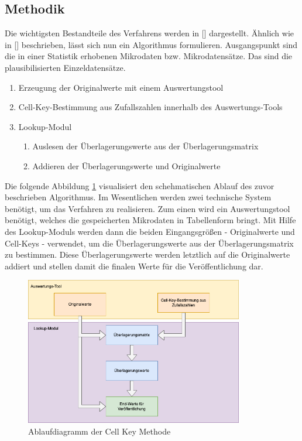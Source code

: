 \subsection{Methodik}%

Die wichtigsten Bestandteile des Verfahrens werden in [\cite{Enderle}] dargestellt. Ähnlich wie in [\cite{Wipke}] beschrieben, lässt sich nun ein Algorithmus formulieren. Ausgangspunkt sind die in einer Statistik erhobenen Mikrodaten bzw. Mikrodatensätze. Das sind die plausibilisierten Einzeldatensätze.

\begin{enumerate}
    \item Erzeugung der Originalwerte mit einem Auswertungstool
    \item Cell-Key-Bestimmung aus Zufallszahlen innerhalb des Auswertungs-Tools
    \item Lookup-Modul
    \begin{enumerate}
        \item Auslesen der Überlagerungswerte aus der Überlagerungsmatrix
        \item Addieren der Überlagerungswerte und Originalwerte
    \end{enumerate}
\end{enumerate}

Die folgende Abbildung \ref{fig_ckm_chart} visualisiert den schehmatischen Ablauf des zuvor beschrieben Algorithmus. Im Wesentlichen werden zwei technische System benötigt, um das Verfahren zu realisieren. Zum einen wird ein Auswertungstool benötigt, welches die gespeicherten Mikrodaten in Tabellenform bringt. Mit Hilfe des Lookup-Moduls werden dann die beiden Eingangsgrö\ss en - Originalwerte und Cell-Keys - verwendet, um die Überlagerungswerte aus der Überlagerungsmatrix zu bestimmen. Diese Überlagerungswerte werden letztlich auf die Originalwerte addiert und stellen damit die finalen Werte für die Veröffentlichung dar. 

\begin{figure}[H]
    \begin{center}
        \includegraphics[width=0.85\textwidth]{img/ckm_flow.png}
        \caption{Ablaufdiagramm der Cell Key Methode}
        \label{fig_ckm_chart}
    \end{center}
\end{figure}

